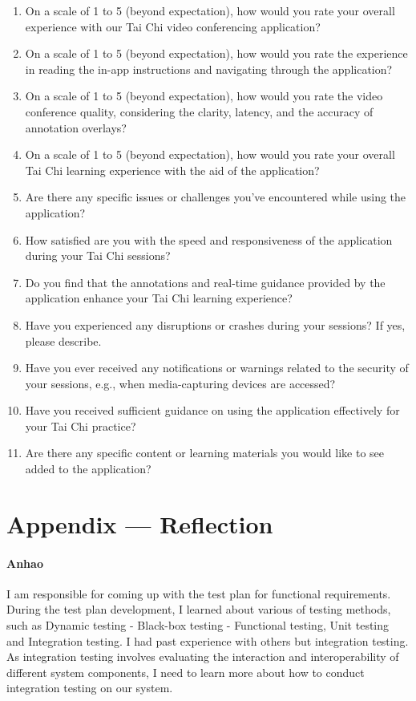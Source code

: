 \documentclass[12pt, titlepage]{article}
\begin{document}
\begin{enumerate}
\item On a scale of 1 to 5 (beyond expectation), how would you rate your overall
  experience with our Tai Chi video conferencing application?
\item On a scale of 1 to 5 (beyond expectation), how would you rate the experience
  in reading the in-app instructions and navigating through the application?
\item On a scale of 1 to 5 (beyond expectation), how would you rate the video
  conference quality, considering the clarity, latency, and the accuracy of
  annotation overlays?
\item On a scale of 1 to 5 (beyond expectation), how would you rate your overall
  Tai Chi learning experience with the aid of the application?
\item Are there any specific issues or challenges you've encountered while using
  the application?
\item How satisfied are you with the speed and responsiveness of the application
  during your Tai Chi sessions?
\item Do you find that the annotations and real-time guidance provided by the
  application enhance your Tai Chi learning experience?
\item Have you experienced any disruptions or crashes during your sessions? If yes,
  please describe.
\item Have you ever received any notifications or warnings related to the security
  of your sessions, e.g., when media-capturing devices are accessed?
\item Have you received sufficient guidance on using the application effectively
  for your Tai Chi practice?
\item Are there any specific content or learning materials you would like to see
  added to the application?
\end{enumerate}

\newpage{}
\section*{Appendix --- Reflection}

\paragraph*{Anhao}
I am responsible for coming up with the test plan for functional requirements.
During the test plan development, I learned about various of testing methods,
such as Dynamic testing - Black-box testing - Functional testing, Unit testing
and Integration testing. I had past experience with others but integration
testing. As integration testing involves evaluating the interaction and
interoperability of different system components, I need to learn more about how
to conduct integration testing on our system.
\end{document}
